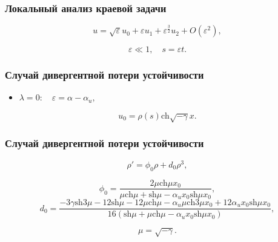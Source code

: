 \documentclass[fullscreen=true, unicode, bookmarks=false]{beamer}
\begin{document}
\begin{frame}
\frametitle{ Локальный анализ краевой задачи }

\begin{equation}
	u = \sqrt{\varepsilon}u_0 + \varepsilon u_1 + \varepsilon^{\frac{3}{2}} u_2 + O(\varepsilon^2),
\end{equation}

\bigskip

$$ \varepsilon \ll 1, \quad s = \varepsilon t. $$

\end{frame}

\begin{frame}
\frametitle{ Случай дивергентной потери устойчивости }

\begin{itemize}
\item { $ \lambda = 0: \quad \varepsilon=\alpha-\alpha_u, $
}
\end{itemize}

\bigskip

\begin{equation}
	u_0 = \rho(s) \mbox{ch} \sqrt{-\gamma} x.
\end{equation}

\end{frame}

\begin{frame}
\frametitle{ Случай дивергентной потери устойчивости }

\begin{equation}
	\rho' = \phi_0 \rho + d_0 \rho^3,
\end{equation}

\bigskip
\pause

$$ \phi_0 = \frac{ 2 \mu \mbox{ch} \mu x_0 }{ \mu \mbox{ch} \mu +\mbox{sh} \mu - \alpha_u x_0 \mbox{sh} \mu x_0 }, $$
$$ d_0 = \frac{ -3\gamma \mbox{sh} 3\mu - 12 \mbox{sh} \mu - 12 \mu \mbox{ch} \mu - \alpha_u \mu \mbox{ch} 3\mu x_0 + 12 \alpha_u x_0 \mbox{sh} \mu x_0 }{ 16( \mbox{sh} \mu + \mu \mbox{ch} \mu - \alpha_u x_0 \mbox{sh} \mu x_0 ) }, $$

$$ \mu = \sqrt{-\gamma}. $$

\end{frame}
\end{document}
